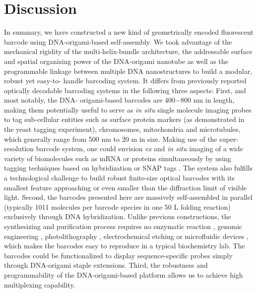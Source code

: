\section{Discussion}
In summary, we have constructed a new kind of geometrically encoded 
fluorescent barcode using DNA-origami-based self-assembly. We took advantage of the 
mechanical rigidity of the multi-helix-bundle architecture, the addressable surface and 
spatial organizing power of the DNA-origami nanotube as well as the programmable 
linkage between multiple DNA nanostructures to build a modular, robust yet easy-to-
handle barcoding system. It differs from previously reported optically decodable 
barcoding systems in the following three aspects: First, and most notably, the DNA- 
origami-based barcodes are 400−800 nm in length, making them potentially useful to 
serve as \textit{in situ} single molecule imaging probes to tag sub-cellular entities such as surface 
protein markers (as demonstrated in the yeast tagging experiment), chromosomes, 
mitochondria and microtubules, which generally range from 500 nm to 20 \textmu m in size. 
Making use of the super-resolution barcode system, one could envision \textit{ex} and \textit{in situ} 
imaging of a wide variety of biomolecules such as mRNA or proteins simultaneously by 
using tagging techniques based on hybridization or SNAP tags \citep{gautier_engineered_2008,jones_fast_2011,keppler_general_2003,klein_live-cell_2011}. The system also 
fulfills a technological challenge to build robust finite-size optical barcodes with its 
smallest feature approaching or even smaller than the diffraction limit of visible light. 
Second, the barcodes presented here are massively self-assembled in parallel (typically 
1011 molecules per barcode species in one 50 \textmu L folding reaction) exclusively through 
DNA hybridization. Unlike previous constructions, the synthesizing and purification 
process requires no enzymatic reaction \citep{geiss_direct_2008}, genomic engineering \citep{livet_transgenic_2007}, photolithography \citep{pregibon_multifunctional_2007}, 
electrochemical etching \citep{cunin_biomolecular_2002} or microfluidic devices \citep{fournier-bidoz_facile_2008, pregibon_multifunctional_2007}, which makes the barcodes easy to 
reproduce in a typical biochemistry lab. The barcodes could be functionalized to display 
sequence-specific probes simply through DNA-origami staple extensions. Third, the 
robustness and programmability of the DNA-origami-based platform allows us to achieve 
high multiplexing capability. 

